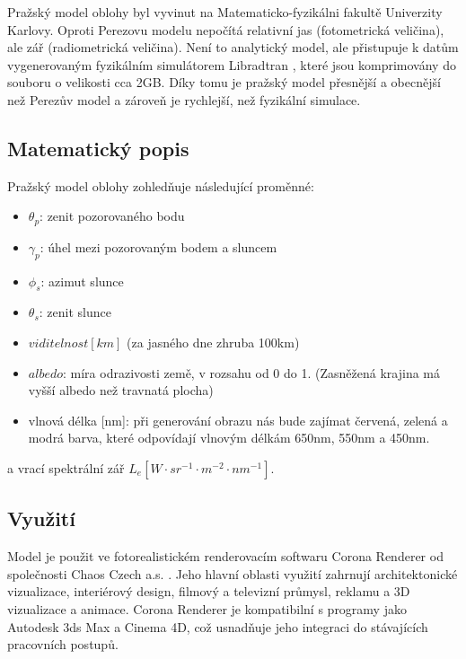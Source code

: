Pražský model oblohy \citep{Prague2021} byl vyvinut na Matematicko-fyzikálni fakultě Univerzity Karlovy. 
Oproti Perezovu modelu nepočítá relativní jas (fotometrická veličina), ale zář (radiometrická veličina). 
Není to analytický model, ale přistupuje k datům vygenerovaným fyzikálním simulátorem Libradtran \citep{Libradtran2016}, které jsou komprimovány do souboru o velikosti cca 2GB. 
Díky tomu je pražský model přesnější a obecnější než Perezův model a zároveň je rychlejší, než fyzikální simulace.

\subsection{Matematický popis}
Pražský model oblohy zohledňuje následující proměnné: 
\begin{itemize}
  \item $\theta_p$: zenit pozorovaného bodu
  \item $\gamma_p$: úhel mezi pozorovaným bodem a sluncem
  \item $\phi_s$: azimut slunce
  \item $\theta_s$: zenit slunce
  \item $viditelnost[km]$ (za jasného dne zhruba 100km)
  \item $albedo$: míra odrazivosti země, v rozsahu od 0 do 1. (Zasněžená krajina má vyšší albedo než travnatá plocha)
  \item vlnová délka [nm]: při generování obrazu nás bude zajímat červená, zelená a modrá barva, které odpovídají vlnovým délkám 650nm, 550nm a 450nm. 
\end{itemize}
a vrací spektrální zář  $L_e [W \cdot sr^{-1} \cdot m^{-2} \cdot nm^{-1}]$.
\subsection{Využití}
Model je použit ve fotorealistickém renderovacím softwaru Corona Renderer od společnosti Chaos Czech a.s. \citep{corona}. 
Jeho hlavní oblasti využití zahrnují architektonické vizualizace, interiérový design, filmový a televizní průmysl, reklamu a 3D vizualizace a animace. Corona Renderer je kompatibilní s programy jako Autodesk 3ds Max a Cinema 4D, což usnadňuje jeho integraci do stávajících pracovních postupů.

